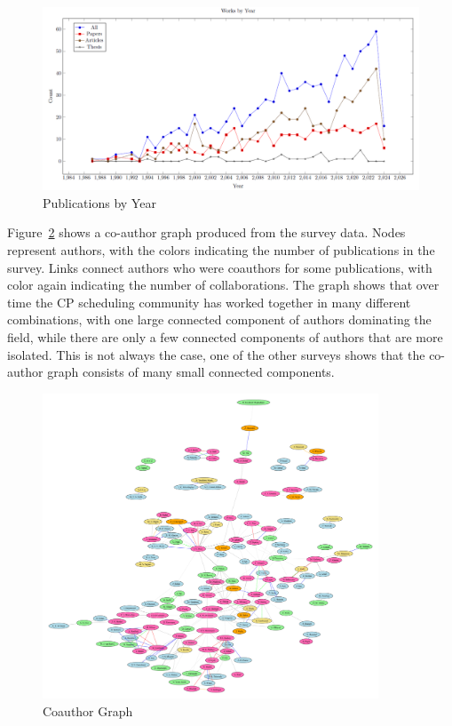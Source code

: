 \documentclass[
 hf]{ceurart}
\begin{document}
\begin{figure}[htbp]
\includegraphics[width=\textwidth]{images/byyear}
\caption{\label{fig:byyear}Publications by Year}
\end{figure}

Figure~\ref{fig:coauthorgraph} shows a co-author graph produced from the survey data. Nodes represent authors, with the colors indicating the number of publications in the survey. Links connect authors who were coauthors for some publications, with color again indicating the number of collaborations. The graph shows that over time the CP scheduling community has worked together in many different combinations, with one large connected component of authors dominating the field, while there are only a few connected components of authors that are more isolated. This is not always the case, one of the other surveys shows that the co-author graph consists of many small connected components.  

\begin{figure}[htbp]
\centering
\includegraphics[width=10cm]{images/fdp}
\caption{\label{fig:coauthorgraph}Coauthor Graph}
\end{figure}
\end{document}
